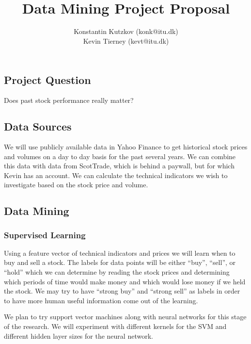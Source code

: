 \documentclass[11pt]{article}
\begin{document}
\title{Data Mining Project Proposal}
\author{Konstantin Kutzkov (konk@itu.dk) \\ Kevin Tierney  (kevt@itu.dk)}

\maketitle

\vspace{-40pt}

\subsection*{Project Question}

Does past stock performance really matter?

\vspace{-10pt}
\subsection*{Data Sources}

We will use publicly available data in Yahoo Finance to get historical stock
prices and volumes on a day to day basis for the past several years. We can
combine this data with data from ScotTrade, which is behind a paywall, but for
which Kevin has an account.  We can calculate the technical indicators we wish
to investigate based on the stock price and volume.

\vspace{-10pt}
\subsection*{Data Mining}

\vspace{-5pt}
\subsubsection*{Supervised Learning}

Using a feature vector of technical indicators and prices we will learn when to
buy and sell a stock. The labels for data points will be either ``buy'',
``sell'', or ``hold'' which we can determine by reading the stock prices and
determining which periods of time would make money and which would lose money
if we held the stock. We may try to have ``strong buy'' and ``strong sell'' as
labels in order to have more human useful information come out of the learning.

We plan to try support vector machines along with neural networks for this
stage of the research. We will experiment with different kernels for the SVM
and different hidden layer sizes for the neural network.
\end{document}
